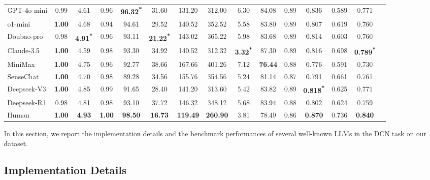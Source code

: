 \begin{table*}[ht]
{{\begin{tabular}{l|cc|cc|ccc|ccc|cccc}
        GPT-4o-mini & 0.99 & 4.61 & 0.96 & \textbf{96.32\textsuperscript{*}} & 31.60 & 131.20 & 312.00 & 6.30 & 84.08 & 0.89 & 0.836 & 0.589 & 0.771\\
        o1-mini & \textbf{1.00} & 4.68 & 0.94 & 94.61 & 29.52 & 140.52 & 352.52 & 5.58 & 83.80 & 0.89 & 0.807 & 0.619 & 0.760\\
        Doubao-pro & 0.98 & \textbf{4.91\textsuperscript{*}} & 0.96 & 93.11 & \textbf{21.22\textsuperscript{*}} & 143.02 & 365.22 & 5.98 & 83.68 & 0.89 & 0.814 & 0.603 & 0.760\\
        Claude-3.5 & \textbf{1.00} & 4.59 & 0.98 & 93.30 & 34.92 & 140.52 & 312.32 & \textbf{3.32\textsuperscript{*}} & 87.30 & 0.89 & 0.816 & 0.698 & \textbf{0.789\textsuperscript{*}}\\
        MiniMax & \textbf{1.00} & 4.75 & 0.96 & 92.77 & 38.66 & 167.66 & 401.26 & 7.12 & \textbf{76.44} & 0.88 & 0.776 & 0.591 & 0.730\\
        SenseChat & \textbf{1.00} & 4.70 & 0.98 & 89.28 & 34.56 & 155.76 & 354.56 & 5.24 & 81.14 & 0.87 & 0.791 & 0.661 & 0.761\\
        Deepseek-V3 & \textbf{1.00} & 4.85 & 0.99 & 91.65 & 28.40 & 141.20 & 313.60 & 5.42 & 83.82 & 0.89 & \textbf{0.818\textsuperscript{*}} & 0.625 & 0.771\\
        Deepseek-R1 & 0.98 & 4.81 & 0.98 & 93.10 & 37.72 & 146.32 & 348.12 & 5.68 & 83.94 & 0.88 & 0.802 & 0.624 & 0.759\\
        \midrule
        Human & \textbf{1.00} & \textbf{4.93} & \textbf{1.00} & \textbf{98.50} & \textbf{16.73} & \textbf{119.49} & \textbf{260.90} & 3.81 & 78.49 & 0.86 & \textbf{0.870} & 0.736 & \textbf{0.840}\\
        \bottomrule
    \end{tabular}%
 }}
 \label{tab:mainresults}
     \vspace{-10pt}
\end{table*}


In this section, we report the implementation details and the benchmark performances of several well-known LLMs in the DCN task on our dataset. 

\subsection{Implementation Details}


